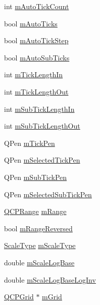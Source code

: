 \begin{DoxyCompactItemize}
int \hyperlink{class_q_c_p_axis_a499fbb67111e4b204738f6c1aa28d842}{m\-Auto\-Tick\-Count}
\item 
bool \hyperlink{class_q_c_p_axis_aac23adcbae246bf165d4539ad65ac9f9}{m\-Auto\-Ticks}
\item 
bool \hyperlink{class_q_c_p_axis_aada8934a5c44978653031782aa37d101}{m\-Auto\-Tick\-Step}
\item 
bool \hyperlink{class_q_c_p_axis_aaae980b0d193d959674e314dbb6c2c3b}{m\-Auto\-Sub\-Ticks}
\item 
int \hyperlink{class_q_c_p_axis_aea36f29c70d611b4486ebb3a8897c7cd}{m\-Tick\-Length\-In}
\item 
int \hyperlink{class_q_c_p_axis_a2951f26d8a504d330157e05063513809}{m\-Tick\-Length\-Out}
\item 
int \hyperlink{class_q_c_p_axis_a6c1400cfa6fb129a6686797fb5ca0307}{m\-Sub\-Tick\-Length\-In}
\item 
int \hyperlink{class_q_c_p_axis_ae0342609ad543c2667673d75b43d9dbb}{m\-Sub\-Tick\-Length\-Out}
\item 
Q\-Pen \hyperlink{class_q_c_p_axis_a1d52c78c856d8bd1f331d4ec4e63d944}{m\-Tick\-Pen}
\item 
Q\-Pen \hyperlink{class_q_c_p_axis_a9524593dbc75a5c5b29dbd1cb4b37df5}{m\-Selected\-Tick\-Pen}
\item 
Q\-Pen \hyperlink{class_q_c_p_axis_a32ef56d3a417866720eb12667d27dbd1}{m\-Sub\-Tick\-Pen}
\item 
Q\-Pen \hyperlink{class_q_c_p_axis_aa5cc6afc5dc2a365f5abbd36eb04a1dc}{m\-Selected\-Sub\-Tick\-Pen}
\item 
\hyperlink{class_q_c_p_range}{Q\-C\-P\-Range} \hyperlink{class_q_c_p_axis_a1ee36773c49062d751560e11f90845f7}{m\-Range}
\item 
bool \hyperlink{class_q_c_p_axis_a5cb034f57aa3d773a9ca55a0931dbf7b}{m\-Range\-Reversed}
\item 
\hyperlink{class_q_c_p_axis_a36d8e8658dbaa179bf2aeb973db2d6f0}{Scale\-Type} \hyperlink{class_q_c_p_axis_ad706039549cbbbec5fcb2baf7894e04d}{m\-Scale\-Type}
\item 
double \hyperlink{class_q_c_p_axis_abc727ddb4af745151755d1b5e60d03c3}{m\-Scale\-Log\-Base}
\item 
double \hyperlink{class_q_c_p_axis_a93e068984b475467929e7f6768754227}{m\-Scale\-Log\-Base\-Log\-Inv}
\item 
\hyperlink{class_q_c_p_grid}{Q\-C\-P\-Grid} $\ast$ \hyperlink{class_q_c_p_axis_a17bffb94aaa40311f259c6ac7bcb5d5f}{m\-Grid}
\item 

\end{DoxyCompactItemize}
